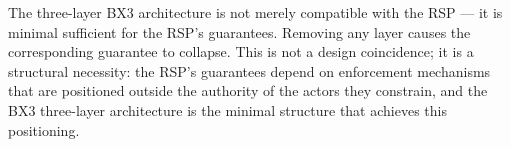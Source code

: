 The three-layer BX3 architecture is not merely compatible with the RSP — it is minimal sufficient for the RSP's guarantees. Removing any layer causes the corresponding guarantee to collapse. This is not a design coincidence; it is a structural necessity: the RSP's guarantees depend on enforcement mechanisms that are positioned outside the authority of the actors they constrain, and the BX3 three-layer architecture is the minimal structure that achieves this positioning.